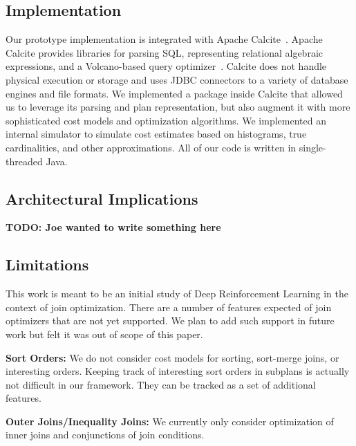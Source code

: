 \subsection{Implementation}
Our prototype implementation is integrated with Apache Calcite~\cite{calcite}.
Apache Calcite provides libraries for parsing SQL, representing relational algebraic expressions, and a Volcano-based query optimizer~\cite{graefe1991volcano}. Calcite does not handle physical execution or storage and uses JDBC connectors to a variety of database engines and file formats.
We implemented a package inside Calcite that allowed us to leverage its parsing and plan representation, but also augment it with more sophisticated cost models and optimization algorithms.
We implemented an internal simulator to simulate cost estimates based on histograms, true cardinalities, and other approximations.
All of our code is written in single-threaded Java.

\subsection{Architectural Implications}
\textbf{TODO: Joe wanted to write something here}


\subsection{Limitations}
This work is meant to be an initial study of Deep Reinforcement Learning in the context of join optimization. There are a number of features expected of join optimizers that are not yet supported. We plan to add such support in future work but felt it was out of scope of this paper.

 \vspace{0.5em} \noindent \textbf{Sort Orders: } We do not consider cost models for sorting, sort-merge joins, or interesting orders. Keeping track of interesting sort orders in subplans is actually not difficult in our framework. They can be tracked as a set of additional features. 

\vspace{0.5em} \noindent  \textbf{Outer Joins/Inequality Joins: } We currently only consider optimization of inner joins and conjunctions of join conditions.

